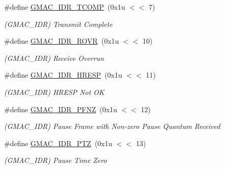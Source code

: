 \begin{DoxyCompactItemize}
\mbox{\label{group__SAME70__GMAC_ga66627979744c990f93143b1dfcd2f9b6}} 
\#define \mbox{\hyperlink{group__SAME70__GMAC_ga66627979744c990f93143b1dfcd2f9b6}{G\+M\+A\+C\+\_\+\+I\+D\+R\+\_\+\+T\+C\+O\+MP}}~(0x1u $<$$<$ 7)
\begin{DoxyCompactList}\small\item\em (G\+M\+A\+C\+\_\+\+I\+DR) Transmit Complete \end{DoxyCompactList}\item 
\mbox{\label{group__SAME70__GMAC_ga6babb73eca9b6745dac4d0be12d2d8d1}} 
\#define \mbox{\hyperlink{group__SAME70__GMAC_ga6babb73eca9b6745dac4d0be12d2d8d1}{G\+M\+A\+C\+\_\+\+I\+D\+R\+\_\+\+R\+O\+VR}}~(0x1u $<$$<$ 10)
\begin{DoxyCompactList}\small\item\em (G\+M\+A\+C\+\_\+\+I\+DR) Receive Overrun \end{DoxyCompactList}\item 
\mbox{\label{group__SAME70__GMAC_ga54dea95c6d106159e8634137bcb194cb}} 
\#define \mbox{\hyperlink{group__SAME70__GMAC_ga54dea95c6d106159e8634137bcb194cb}{G\+M\+A\+C\+\_\+\+I\+D\+R\+\_\+\+H\+R\+E\+SP}}~(0x1u $<$$<$ 11)
\begin{DoxyCompactList}\small\item\em (G\+M\+A\+C\+\_\+\+I\+DR) H\+R\+E\+SP Not OK \end{DoxyCompactList}\item 
\mbox{\label{group__SAME70__GMAC_ga8b3327b90bee0982e2e72f3b99245239}} 
\#define \mbox{\hyperlink{group__SAME70__GMAC_ga8b3327b90bee0982e2e72f3b99245239}{G\+M\+A\+C\+\_\+\+I\+D\+R\+\_\+\+P\+F\+NZ}}~(0x1u $<$$<$ 12)
\begin{DoxyCompactList}\small\item\em (G\+M\+A\+C\+\_\+\+I\+DR) Pause Frame with Non-\/zero Pause Quantum Received \end{DoxyCompactList}\item 
\mbox{\label{group__SAME70__GMAC_ga3e738709c18a6afa68c2bf5f6e026e62}} 
\#define \mbox{\hyperlink{group__SAME70__GMAC_ga3e738709c18a6afa68c2bf5f6e026e62}{G\+M\+A\+C\+\_\+\+I\+D\+R\+\_\+\+P\+TZ}}~(0x1u $<$$<$ 13)
\begin{DoxyCompactList}\small\item\em (G\+M\+A\+C\+\_\+\+I\+DR) Pause Time Zero \end{DoxyCompactList}\item 
$$
\end{DoxyCompactItemize}
